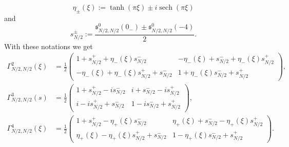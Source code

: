 \documentclass[11pt]{article}
\def\s{\mathfrak s}
\def\sech{\mathop{\mathrm{sech}}\nolimits}
\begin{document}
\begin{equation*}
\eta_\pm(\xi):=\tanh(\pi\xi)\pm i\sech(\pi\xi)
\end{equation*}
and 
$$
s_{N/2}^{\pm}:=\frac{\s^0_{N/2,N/2}(0_-)\pm \s^0_{N/2,N/2}(-4)}2.
$$ 
With these notations we get
\begin{align*}
\Gamma^2_{N/2,N/2} (\xi)
& =\tfrac12\left(\begin{smallmatrix}
    1+s_{N/2}^++\eta_-(\xi)s_{N/2}^- & -\eta_-(\xi)+s_{N/2}^-+\eta_-(\xi)s_{N/2}^+\\
    -\eta_-(\xi) +\eta_-(\xi)s_{N/2}^++s_{N/2}^- & 1+ \eta_-(\xi)s_{N/2}^-+s_{N/2}^+
\end{smallmatrix}\right), \\
\Gamma^3_{N/2,N/2}(s) &  =\tfrac12\left(\begin{smallmatrix}
    1+s_{N/2}^+-is_{N/2}^- & i+s_{N/2}^--is_{N/2}^+\\
    i -is_{N/2}^++s_{N/2}^- & 1- is_{N/2}^-+s_{N/2}^+
\end{smallmatrix}\right), \\
\Gamma^4_{N/2,N/2}(\xi) & =\tfrac12\left(\begin{smallmatrix}
    1+s_{N/2}^+-\eta_+(\xi)s_{N/2}^- & \eta_+(\xi)+s_{N/2}^--\eta_+(\xi)s_{N/2}^+\\
    \eta_+(\xi) -\eta_+(\xi)s_{N/2}^++s_{N/2}^- & 1- \eta_+(\xi)s_{N/2}^-+s_{N/2}^+
\end{smallmatrix}\right).
\end{align*}
\end{document}
